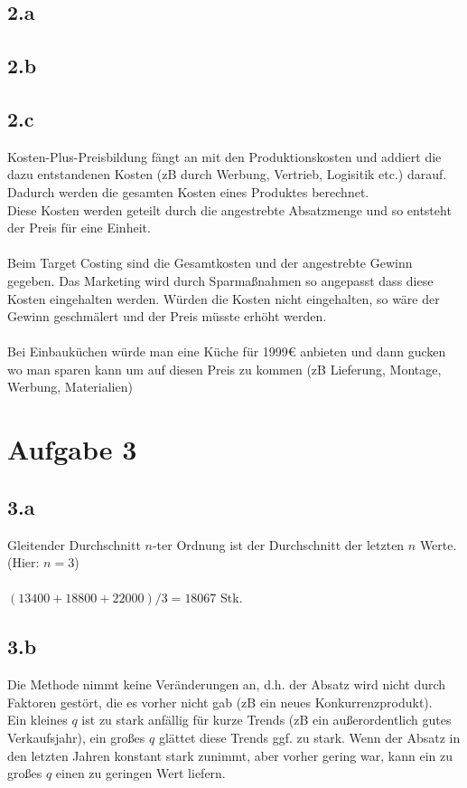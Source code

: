 \subsection*{2.a}
\subsection*{2.b}
\subsection*{2.c}
Kosten-Plus-Preisbildung fängt an mit den Produktionskosten und addiert die dazu entstandenen Kosten (zB durch Werbung, Vertrieb, Logisitik etc.) darauf. Dadurch werden die gesamten Kosten eines Produktes berechnet. \\
Diese Kosten werden geteilt durch die angestrebte Absatzmenge und so entsteht der Preis für eine Einheit. \\
\ \\
Beim Target Costing sind die Gesamtkosten und der angestrebte Gewinn gegeben. Das Marketing wird durch Sparmaßnahmen so angepasst dass diese Kosten eingehalten werden. Würden die Kosten nicht eingehalten, so wäre der Gewinn geschmälert und der Preis müsste erhöht werden.\\
\ \\
Bei Einbauküchen würde man eine Küche für 1999€ anbieten und dann gucken wo man sparen kann um auf diesen Preis zu kommen (zB Lieferung, Montage, Werbung, Materialien)

\section*{Aufgabe 3}
\subsection*{3.a}
Gleitender Durchschnitt $n$-ter Ordnung ist der Durchschnitt der letzten $n$ Werte. (Hier: $n=3$) \\
\ \\
$(13400+18800+22000)/3 = 18067$ Stk. \\

\subsection*{3.b}
Die Methode nimmt keine Veränderungen an, d.h. der Absatz wird nicht durch Faktoren gestört, die es vorher nicht gab (zB ein neues Konkurrenzprodukt). \\
Ein kleines $q$ ist zu stark anfällig für kurze Trends (zB ein außerordentlich gutes Verkaufsjahr), ein großes $q$ glättet diese Trends ggf. zu stark. Wenn der Absatz in den letzten Jahren konstant stark zunimmt, aber vorher gering war, kann ein zu großes $q$ einen zu geringen Wert liefern. \\

